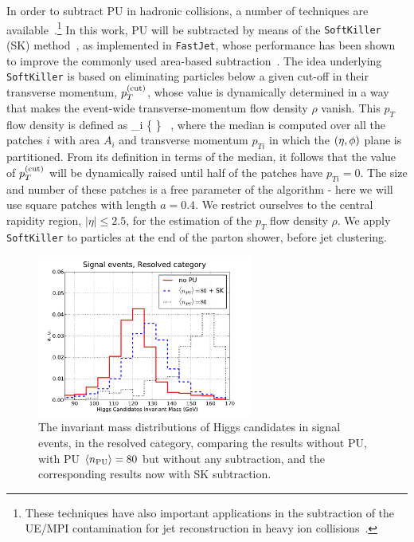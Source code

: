 %
In order to subtract PU in hadronic collisions, a number of techniques
are available~\cite{Cacciari:2009dp,TheATLAScollaboration:2013pia,Butterworth:2008iy,Cacciari:2007fd,Krohn:2009th,Krohn:2013lba,Ellis:2009me,Bertolini:2014bba,Cacciari:2014gra,Cacciari:2014jta,Berta:2014eza,Larkoski:2014wba}.\footnote{
These techniques have also important applications in the subtraction
of the UE/MPI contamination for jet reconstruction
in heavy ion collisions~\cite{Cacciari:2010te}.
}
%
In this work, PU  will be subtracted by means
of the {\tt SoftKiller} (SK)
method~\cite{Cacciari:2014gra}, as implemented in {\tt FastJet},
whose performance has been shown to
improve the commonly used area-based subtraction~\cite{Cacciari:2009dp}.
%
The idea underlying {\tt SoftKiller} is based on eliminating particles
below a given cut-off in their transverse momentum, $p_T^{\rm (cut)}$, whose
value is dynamically determined in a way that makes the event-wide
transverse-momentum flow density $\rho$ vanish.
%
This $p_T$ flow density is defined as
\be
\rho{}_i \Bigg\{ \Bigg\} \, ,
\ee
where the median is computed over all the patches $i$ with area
$A_i$ and transverse momentum $p_{Ti}$ in which the $\left( \eta,\phi\right)$ plane
is partitioned.
%
From its definition in terms of the median,
it follows that the value of $p_T^{(\rm cut)}$
will be dynamically raised until half of the patches have
$p_{Ti}=0$.
%
The size and number of these patches is a free parameter of the algorithm -
here we will use square patches with length $a=0.4$.
%
We restrict ourselves to the central rapidity region,
$|\eta| \le 2.5$, for the estimation of the
$p_T$ flow density $\rho$.
%
We apply {\tt SoftKiller}
to particles at the end of the parton shower, before
jet clustering.


\begin{figure}[t]
  \begin{center}
  \includegraphics[width=0.63\textwidth]{plots/m_htot_res_signal_PUnoSK.pdf}
    \caption{\small
    The invariant mass distributions of Higgs candidates in signal
events, in the resolved category, comparing the results without PU,
with PU $\left\langle n_{\rm PU}\right\rangle=80$ but without any subtraction, and the
corresponding results now with SK subtraction.
}
\label{fig:PUvalidation}
\end{center}
\end{figure}

